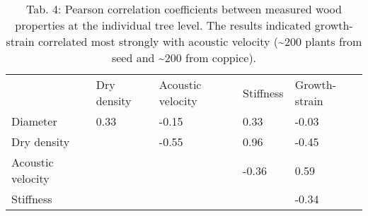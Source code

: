 \begin{table}
\centering
\caption{Tab. 4: Pearson correlation coefficients between measured wood properties at the individual tree level. The results indicated growth-strain correlated most strongly with acoustic velocity (\sim 200 plants from seed and \sim 200 from coppice). }
\begin{tabular}{lllll}
                  & Dry density & Acoustic velocity & Stiffness & Growth-strain \\
Diameter          & 0.33        & -0.15             & 0.33      & -0.03         \\
Dry density       &             & -0.55             & 0.96      & -0.45         \\
Acoustic velocity &             &                   & -0.36     & 0.59          \\
Stiffness         &             &                   &           & -0.34        
\end{tabular}
\end{table}